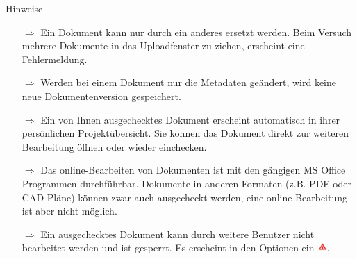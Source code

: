 \documentclass{article}
\begin{document}
\begin{beamerlikethm}{Hinweise}
\begin{itemize}
  \item[$\Longrightarrow$] Ein Dokument kann nur durch ein anderes ersetzt werden. Beim Versuch mehrere Dokumente in das Uploadfenster zu ziehen, erscheint eine Fehlermeldung.
 \item[$\Longrightarrow$] Werden bei einem Dokument nur die Metadaten geändert, wird keine neue Dokumentenversion gespeichert.
 \item[$\Longrightarrow$] Ein von Ihnen ausgechecktes Dokument erscheint automatisch in ihrer persönlichen Projektübersicht. Sie können das Dokument direkt zur weiteren Bearbeitung öffnen oder wieder einchecken.
 \item[$\Longrightarrow$] Das online-Bearbeiten von Dokumenten ist mit den gängigen MS Office Programmen durchführbar. Dokumente in anderen Formaten (z.B. PDF oder CAD-Pläne) können
zwar auch ausgecheckt werden, eine online-Bearbeitung ist aber nicht möglich.
 \item[$\Longrightarrow$] Ein ausgechecktes Dokument kann durch weitere Benutzer nicht bearbeitet werden und ist gesperrt. Es erscheint in den Optionen ein \includegraphics[height=10pt]{Icons/Warnung_rot.jpg}.
\end{itemize}
\end{beamerlikethm}


	
	
\end{document}
